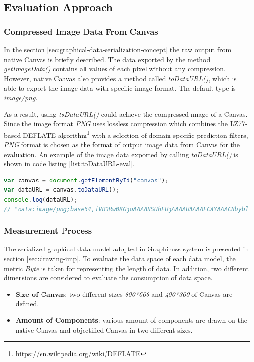 
\subsection{Evaluation Approach}

\subsubsection{Compressed Image Data From Canvas}
In the section \ref{sec:graphical-data-serialization-concept} the raw output from native Canvas is briefly described. The data exported by the method \textit{getImageData()} contains all values of each pixel without any compression. However, native Canvas also provides a method called \textit{toDataURL()}, which is able to export the image data with specific image format. The default type is \textit{image/png}.

As a result, using \textit{toDataURL()} could achieve the compressed image  of a Canvas. Since the image format \textit{PNG} uses lossless compression which combines the LZ77-based DEFLATE algorithm\footnote{https://en.wikipedia.org/wiki/DEFLATE} with a selection of domain-specific prediction filters, \textit{PNG} format is chosen as the format of output image data  from Canvas for the evaluation\cite{barron1998minimum}. An example of the image data exported by calling \textit{toDataURL()} is shown in code listing \ref{list:toDataURL-eval}.


\begin{lstlisting}[language=JavaScript, caption=Example of image data while calling toDataURL() , label={list:toDataURL-eval}]
var canvas = document.getElementById("canvas");
var dataURL = canvas.toDataURL();
console.log(dataURL);
// "data:image/png;base64,iVBORw0KGgoAAAANSUhEUgAAAAUAAAAFCAYAAACNbybl...ADElEQVQImWNgoBMAAABpAAFEI8ARAAAAAElFTkSuQmCC"
\end{lstlisting}

\subsubsection{Measurement Process}
The serialized graphical data model adopted in Graphicuss system is presented in section \ref{sec:drawing-imp}. To evaluate the data space of each data model, the metric \textit{Byte} is taken for representing the length of data. In addition, two different dimensions are considered to evaluate the consumption of data space.

\begin{itemize}
  \item \textbf{Size of Canvas}: two different sizes \textit{800*600} and \textit{400*300} of Canvas are defined.
  \item \textbf{Amount of Components}: various amount of components are drawn on the native Canvas and objectified Canvas in two different sizes.
\end{itemize}

